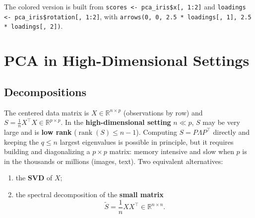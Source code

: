 The colored version is built from \texttt{scores <- pca\_iris\$x[, 1:2]} and \texttt{loadings <- pca\_iris\$rotation[, 1:2]},
with \texttt{arrows(0, 0, 2.5 * loadings[, 1], 2.5 * loadings[, 2])}.


\section{PCA in High-Dimensional Settings}

\subsection{Decompositions}

The centered data matrix is $X \in \mathbb{R}^{n \times p}$ (observations by row) and $S = \frac{1}{n}X^\top X \in \mathbb{R}^{p \times p}$.
In the \textbf{high-dimensional setting} $n \ll p$, $S$ may be very large and is \textbf{low rank}
($\operatorname{rank}(S) \leq n - 1$). Computing $S = P\Lambda P^\top$ directly and keeping the $q \leq n$ largest eigenvalues is
possible in principle, but it requires building and diagonalizing a $p \times p$ matrix: memory intensive and slow when
$p$ is in the thousands or millions (images, text). Two equivalent alternatives:
\begin{enumerate}
  \item the \textbf{SVD} of $X$;
  \item the spectral decomposition of the \textbf{small matrix}
        \[
          \tilde{S} = \frac{1}{n} X X^\top \in \mathbb{R}^{n \times n}.
        \]
\end{enumerate}

